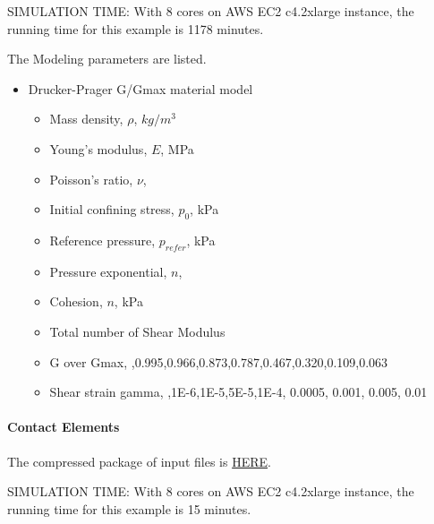 SIMULATION TIME: With 8 cores on AWS EC2 c4.2xlarge instance, the running time for this example is 1178 minutes.

The Modeling parameters are listed.
\begin{itemize}
  \item Drucker-Prager G/Gmax material model 
  \begin{itemize}
    \item Mass density, $\rho$, \enspace {} $kg/m^3$
    \item Young's modulus, $E$, \enspace {} MPa
    \item Poisson's ratio, $\nu$, \enspace {}
    \item Initial confining stress, $p_0$, \enspace {} kPa
    \item Reference pressure, $p_{refer} $, \enspace {} kPa
    \item Pressure exponential, $ n  $, \enspace {}
    \item Cohesion, $ n  $, \enspace {} kPa
    \item Total number of Shear Modulus \enspace {}
    \item G over Gmax, \enspace {},0.995,0.966,0.873,0.787,0.467,0.320,0.109,0.063
    \item Shear strain gamma, \enspace {},1E-6,1E-5,5E-5,1E-4, 0.0005, 0.001, 0.005, 0.01
  \end{itemize}
\end{itemize}


\paragraph{Contact Elements}
The compressed package of input files is  
\href{https://github.com/yuan-energy/Real-ESSI-Short-Course-Examples/tree/master/short-course-examples/nonlinear_analysis_steps/soil-structure/contact/contact.tgz?raw=true}{HERE}. 

SIMULATION TIME: With 8 cores on AWS EC2 c4.2xlarge instance, the running time for this example is 15 minutes.

